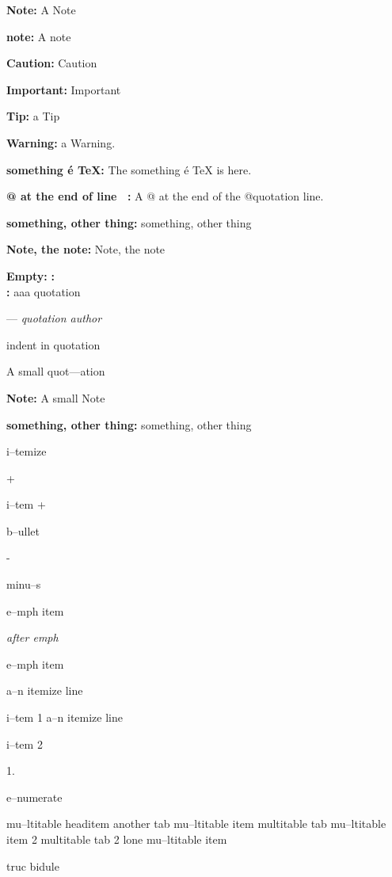 \documentclass{book}
\begin{document}
\textbf{Note:} A Note

\textbf{note:} A note

\textbf{Caution:} Caution

\textbf{Important:} Important

\textbf{Tip:} a Tip

\textbf{Warning:} a Warning.

\textbf{something \'{e} \TeX{}:} The something \'{e} \TeX{} is here.

\textbf{@ at the end of line \ {}:} A @ at the end of the @quotation line.

\textbf{something, other thing:} something, other thing

\textbf{Note, the note:} Note, the note


\textbf{Empty:} 
\textbf{:} 
\textbf{\leavevmode{}\\:} 
aaa quotation
\begin{center}
--- \emph{quotation author}
\end{center}

indent in quotation

A small quot---ation

\textbf{Note:} A small Note

\textbf{something, other thing:} something, other thing

\textbullet{} 

i--temize

+ 

i--tem +

\textbullet{} 

b--ullet

- 

minu--s

\emph{} 

e--mph item

\emph{after emph} 

e--mph item

\textbullet{} a--n itemize line 

i--tem 1
\textbullet{} a--n itemize line 

i--tem 2

1. 

e--numerate

mu--ltitable headitem another tab
mu--ltitable item multitable tab
mu--ltitable item 2 multitable tab 2
lone mu--ltitable item

truc bidule
\end{document}
